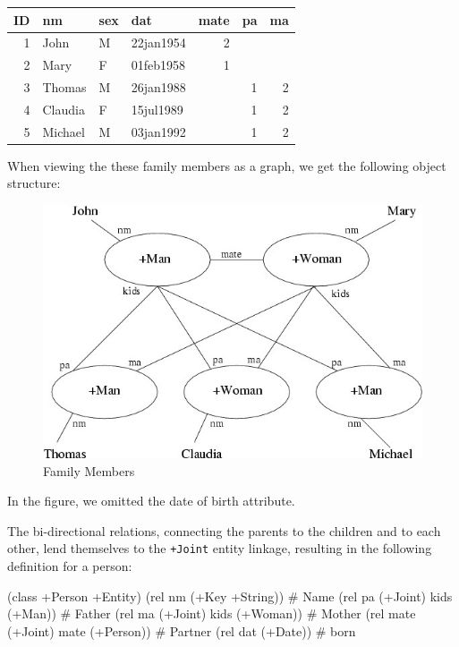 \begin{center}
\begin{tabular}{rlllrrr}
 ID  &  nm       &  sex  &  dat        &  mate  &  pa  &  ma  \\
\hline
  1  &  John     &  M    &  22jan1954  &     2  &      &      \\
  2  &  Mary     &  F    &  01feb1958  &     1  &      &      \\
  3  &  Thomas   &  M    &  26jan1988  &        &   1  &   2  \\
  4  &  Claudia  &  F    &  15jul1989  &        &   1  &   2  \\
  5  &  Michael  &  M    &  03jan1992  &        &   1  &   2  \\
\end{tabular}
\end{center}


When viewing the these family members as a graph, we get the following
object structure:

\begin{figure}[H]
  \centering
  \includegraphics[scale=.5]{graphics/xmplObj.jpg}
  \caption{Family Members}
  \label{fig:family-members}
\end{figure}

In the figure, we omitted the date of birth attribute.

The bi-directional relations, connecting the parents to the children and
to each other, lend themselves to the \texttt{+Joint} entity linkage, resulting
in the following definition for a person:


\begin{wideverbatim}
(class +Person +Entity)
(rel nm   (+Key +String))          # Name
(rel pa   (+Joint) kids (+Man))    # Father
(rel ma   (+Joint) kids (+Woman))  # Mother
(rel mate (+Joint) mate (+Person)) # Partner
(rel dat  (+Date))                 # born
\end{wideverbatim}

